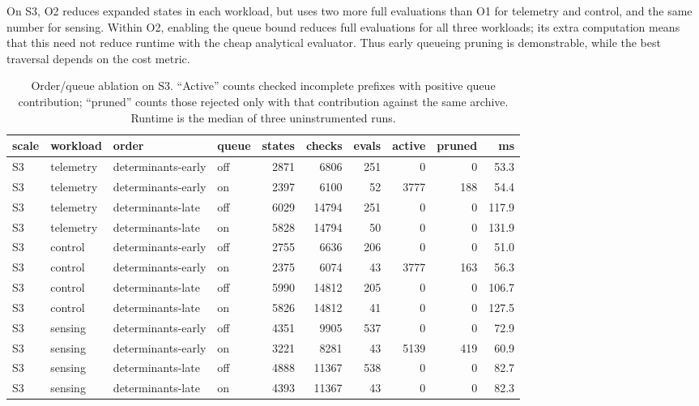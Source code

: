 \documentclass[preprint,11pt,3p]{elsarticle}
\theoremstyle{plain}
\theoremstyle{definition}
\begin{document}
On S3, O2 reduces expanded states in each workload, but uses two more full evaluations
than O1 for telemetry and control, and the same number for sensing. Within O2, enabling
the queue bound reduces full evaluations for all three workloads; its extra computation
means that this need not reduce runtime with the cheap analytical evaluator. Thus early
queueing pruning is demonstrable, while the best traversal depends on the cost metric.
\begin{table}[!htbp]\centering
\caption{Order/queue ablation on S3. ``Active'' counts checked incomplete prefixes with
positive queue contribution; ``pruned'' counts those rejected only with that contribution
against the same archive. Runtime is the median of three uninstrumented runs.}
\label{tab:order}\scriptsize
\begin{tabular}{llllrrrrrr}
\toprule
scale & workload & order & queue & states & checks & evals & active & pruned & ms \\
\midrule
S3 & telemetry & determinants-early & off & 2871 & 6806 & 251 & 0 & 0 & 53.3 \\
S3 & telemetry & determinants-early & on & 2397 & 6100 & 52 & 3777 & 188 & 54.4 \\
S3 & telemetry & determinants-late & off & 6029 & 14794 & 251 & 0 & 0 & 117.9 \\
S3 & telemetry & determinants-late & on & 5828 & 14794 & 50 & 0 & 0 & 131.9 \\
S3 & control & determinants-early & off & 2755 & 6636 & 206 & 0 & 0 & 51.0 \\
S3 & control & determinants-early & on & 2375 & 6074 & 43 & 3777 & 163 & 56.3 \\
S3 & control & determinants-late & off & 5990 & 14812 & 205 & 0 & 0 & 106.7 \\
S3 & control & determinants-late & on & 5826 & 14812 & 41 & 0 & 0 & 127.5 \\
S3 & sensing & determinants-early & off & 4351 & 9905 & 537 & 0 & 0 & 72.9 \\
S3 & sensing & determinants-early & on & 3221 & 8281 & 43 & 5139 & 419 & 60.9 \\
S3 & sensing & determinants-late & off & 4888 & 11367 & 538 & 0 & 0 & 82.7 \\
S3 & sensing & determinants-late & on & 4393 & 11367 & 43 & 0 & 0 & 82.3 \\
\bottomrule
\end{tabular}
\end{table}
\FloatBarrier
\end{document}
